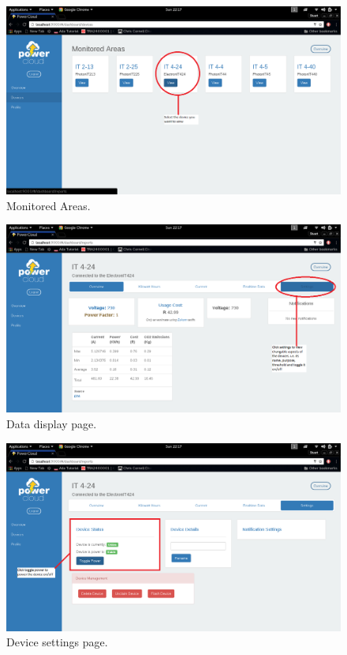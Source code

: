 \documentclass[a4paper,10pt]{article}
\begin{document}
	\begin{figure}[H]
		\includegraphics[width=\textwidth]{images/view.png}
		\caption{Monitored Areas. \label{overflow}}
	\end{figure}
	
	\begin{figure}[H]
		\includegraphics[width=\textwidth]{images/settings1.png}
		\caption{Data display page. \label{overflow}}
	\end{figure}
	
	\begin{figure}[H]
		\includegraphics[width=\textwidth]{images/settings.png}
		\caption{Device settings page. \label{overflow}}
	\end{figure}
	
\end{document}
